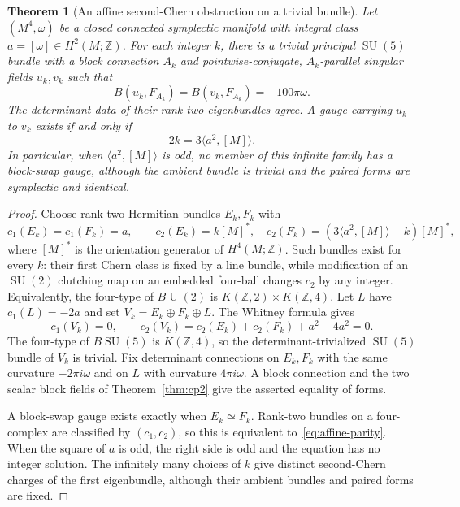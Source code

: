 \documentclass[11pt]{amsart}
\newcommand{\SU}{\operatorname{SU}}
\newcommand{\U}{\operatorname{U}}
\newcommand{\Z}{\mathbb Z}
\theoremstyle{plain}
\newtheorem{theorem}{Theorem}[section]
\theoremstyle{definition}
\theoremstyle{remark}
\begin{document}
\begin{theorem}[An affine second-Chern obstruction on a trivial bundle]\label{thm:trivialP}
Let $(M^4,\omega)$ be a closed connected symplectic manifold with integral class $a=[\omega]\in H^2(M;\Z)$. For each integer $k$, there is a trivial principal $\SU(5)$ bundle with a block connection $A_k$ and pointwise-conjugate, $A_k$-parallel singular fields $u_k,v_k$ such that
\[
 B(u_k,F_{A_k})=B(v_k,F_{A_k})=-100\pi\omega.
\]
The determinant data of their rank-two eigenbundles agree. A gauge carrying $u_k$ to $v_k$ exists if and only if
\begin{equation}\label{eq:affine-parity}
 2k=3\langle a^2,[M]\rangle.
\end{equation}
In particular, when $\langle a^2,[M]\rangle$ is odd, no member of this infinite family has a block-swap gauge, although the ambient bundle is trivial and the paired forms are symplectic and identical.
\end{theorem}

\begin{proof}
Choose rank-two Hermitian bundles $E_k,F_k$ with
\[
 c_1(E_k)=c_1(F_k)=a,\qquad
 c_2(E_k)=k[M]^*,\quad
 c_2(F_k)=(3\langle a^2,[M]\rangle-k)[M]^*,
\]
where $[M]^*$ is the orientation generator of $H^4(M;\Z)$. Such bundles exist for every $k$: their first Chern class is fixed by a line bundle, while modification of an $\SU(2)$ clutching map on an embedded four-ball changes $c_2$ by any integer. Equivalently, the four-type of $B\U(2)$ is $K(\Z,2)\times K(\Z,4)$. Let $L$ have $c_1(L)=-2a$ and set $V_k=E_k\oplus F_k\oplus L$. The Whitney formula gives
\[
 c_1(V_k)=0,\qquad
 c_2(V_k)=c_2(E_k)+c_2(F_k)+a^2-4a^2=0.
\]
The four-type of $B\SU(5)$ is $K(\Z,4)$, so the determinant-trivialized $\SU(5)$ bundle of $V_k$ is trivial. Fix determinant connections on $E_k,F_k$ with the same curvature $-2\pi i\omega$ and on $L$ with curvature $4\pi i\omega$. A block connection and the two scalar block fields of Theorem~\ref{thm:cp2} give the asserted equality of forms.

A block-swap gauge exists exactly when $E_k\simeq F_k$. Rank-two bundles on a four-complex are classified by $(c_1,c_2)$, so this is equivalent to~\eqref{eq:affine-parity}. When the square of $a$ is odd, the right side is odd and the equation has no integer solution. The infinitely many choices of $k$ give distinct second-Chern charges of the first eigenbundle, although their ambient bundles and paired forms are fixed.
\end{proof}
\end{document}
